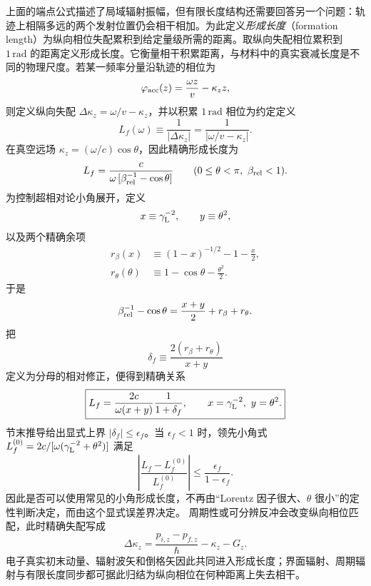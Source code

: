 上面的端点公式描述了局域辐射振幅，但有限长度结构还需要回答另一个问题：轨迹上相隔多远的两个发射位置仍会相干相加。为此定义\emph{形成长度}（formation length）为纵向相位失配累积到给定量级所需的距离。取纵向失配相位累积到 $1\,\mathrm{rad}$ 的距离定义形成长度。它衡量相干积累距离，与材料中的真实衰减长度是不同的物理尺度。若某一频率分量沿轨迹的相位为
\begin{equation*}
\varphi_{\rm acc}(z)=\frac{\omega z}{v}-\kappa_zz,
\end{equation*}
则定义纵向失配 $\Delta \kappa_z=\omega/v-\kappa_z$，并以积累 $1\,\mathrm{rad}$ 相位为约定定义
\begin{equation}
\boxed{
L_f(\omega)\equiv\frac1{|\Delta \kappa_z|}
=\frac1{|\omega/v-\kappa_z|}.}
\label{eq:formation_length_general_mismatch}
\end{equation}
在真空远场 $\kappa_z=(\omega/c)\cos\theta$，因此精确形成长度为
\begin{equation*}
L_f
=\frac{c}{\omega\,[\beta_{\rm rel}^{-1}-\cos\theta]}
\qquad (0\le\theta<\pi,\ \beta_{\rm rel}<1).
\end{equation*}
为控制超相对论小角展开，定义
\begin{equation*}
 x\equiv\gamma_{\rm L}^{-2},
 \qquad y\equiv\theta^2,
\end{equation*}
以及两个精确余项
\begin{align*}
 r_\beta(x)
 &\equiv(1-x)^{-1/2}-1-\frac{x}{2},\\
 r_\theta(\theta)
 &\equiv1-\cos\theta-\frac{\theta^2}{2}.
\end{align*}
于是
\begin{equation*}
\beta_{\rm rel}^{-1}-\cos\theta
=\frac{x+y}{2}+r_\beta+r_\theta.
\end{equation*}
把
\begin{equation*}
\delta_f\equiv\frac{2(r_\beta+r_\theta)}{x+y}
\end{equation*}
定义为分母的相对修正，便得到精确关系
\begin{equation}
\boxed{
L_f
=\frac{2c}{\omega(x+y)}\frac{1}{1+\delta_f},
\qquad
x=\gamma_{\rm L}^{-2},\ y=\theta^2.}
\label{eq:formation_length_ultrarelativistic}
\end{equation}
节末推导给出显式上界 $|\delta_f|\le\epsilon_f$。当 $\epsilon_f<1$ 时，领先小角式
$L_f^{(0)}=2c/[\omega(\gamma_{\rm L}^{-2}+\theta^2)]$
满足
\begin{equation*}
\left|\frac{L_f-L_f^{(0)}}{L_f^{(0)}}\right|
\le\frac{\epsilon_f}{1-\epsilon_f}.
\end{equation*}
因此是否可以使用常见的小角形成长度，不再由“Lorentz 因子很大、$\theta$ 很小”的定性判断决定，而由这个显式误差界决定。
周期性或可分辨反冲会改变纵向相位匹配，此时精确失配写成
\begin{equation*}
\Delta \kappa_z
=\frac{p_{i,z}-p_{f,z}}{\hbar}-\kappa_z-G_z.
\end{equation*}
电子真实初末动量、辐射波矢和倒格矢因此共同进入形成长度；界面辐射、周期辐射与有限长度同步都可据此归结为纵向相位在何种距离上失去相干。

